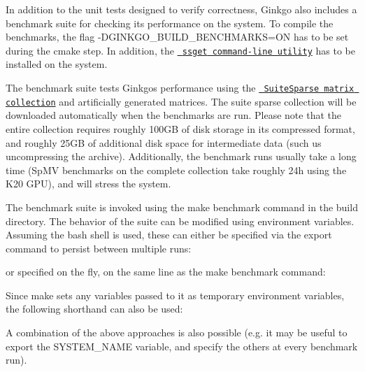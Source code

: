 In addition to the unit tests designed to verify correctness, Ginkgo also includes a benchmark suite for checking its performance on the system. To compile the benchmarks, the flag {\ttfamily -\/D\+G\+I\+N\+K\+G\+O\+\_\+\+B\+U\+I\+L\+D\+\_\+\+B\+E\+N\+C\+H\+M\+A\+R\+KS=ON} has to be set during the {\ttfamily cmake} step. In addition, the \href{https://github.com/ginkgo-project/ssget}{\texttt{ {\ttfamily ssget} command-\/line utility}} has to be installed on the system.

The benchmark suite tests Ginkgo\textquotesingle{}s performance using the \href{https://sparse.tamu.edu/}{\texttt{ Suite\+Sparse matrix collection}} and artificially generated matrices. The suite sparse collection will be downloaded automatically when the benchmarks are run. Please note that the entire collection requires roughly 100GB of disk storage in its compressed format, and roughly 25GB of additional disk space for intermediate data (such us uncompressing the archive). Additionally, the benchmark runs usually take a long time (Sp\+MV benchmarks on the complete collection take roughly 24h using the K20 G\+PU), and will stress the system.

The benchmark suite is invoked using the {\ttfamily make benchmark} command in the build directory. The behavior of the suite can be modified using environment variables. Assuming the {\ttfamily bash} shell is used, these can either be specified via the {\ttfamily export} command to persist between multiple runs\+:


\begin{DoxyCode}{0}
\end{DoxyCode}


or specified on the fly, on the same line as the {\ttfamily make benchmark} command\+:


\begin{DoxyCode}{0}
\end{DoxyCode}


Since {\ttfamily make} sets any variables passed to it as temporary environment variables, the following shorthand can also be used\+:


\begin{DoxyCode}{0}
\end{DoxyCode}


A combination of the above approaches is also possible (e.\+g. it may be useful to {\ttfamily export} the {\ttfamily S\+Y\+S\+T\+E\+M\+\_\+\+N\+A\+ME} variable, and specify the others at every benchmark run).


